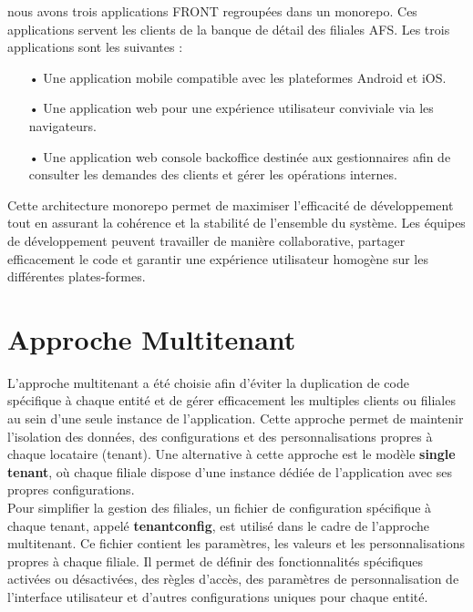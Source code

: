 nous avons trois applications FRONT regroupées dans un monorepo. Ces applications servent les clients de la banque de détail des filiales AFS. Les trois applications sont les suivantes :

\begin{itemize}
    \item[•] Une application mobile compatible avec les plateformes Android et iOS.
    \item[•] Une application web pour une expérience utilisateur conviviale via les navigateurs.
    \item[•] Une application web console backoffice destinée aux gestionnaires afin de consulter les demandes des clients et gérer les opérations internes.
\end{itemize}

Cette architecture monorepo permet de maximiser l'efficacité de développement tout en assurant la cohérence et la stabilité de l'ensemble du système. Les équipes de développement peuvent travailler de manière collaborative, partager efficacement le code et garantir une expérience utilisateur homogène sur les différentes plates-formes.

\section{Approche Multitenant}
L'approche multitenant a été choisie afin d'éviter la duplication de code spécifique à chaque entité et de gérer efficacement les multiples clients ou filiales au sein d'une seule instance de l'application. Cette approche permet de maintenir l'isolation des données, des configurations et des personnalisations propres à chaque locataire (tenant). Une alternative à cette approche est le modèle \textbf{single tenant}, où chaque filiale dispose d'une instance dédiée de l'application avec ses propres configurations.\\

Pour simplifier la gestion des filiales, un fichier de configuration spécifique à chaque tenant, appelé \textbf{tenantconfig}, est utilisé dans le cadre de l'approche multitenant. Ce fichier contient les paramètres, les valeurs et les personnalisations propres à chaque filiale. Il permet de définir des fonctionnalités spécifiques activées ou désactivées, des règles d'accès, des paramètres de personnalisation de l'interface utilisateur et d'autres configurations uniques pour chaque entité.\\

